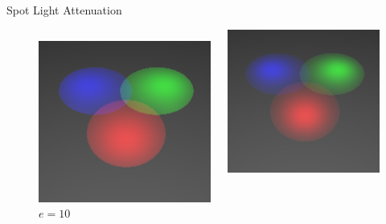 \begin{frame}{Spot Light Attenuation}
{\begin{figure}
\begin{columns}
\begin{column}{0.25\textwidth}
          \includegraphics[width=\linewidth]{images/spot_e_10.png}
          \centering
          {\footnotesize $e=10$}
        \end{column}
        \begin{column}{0.25\textwidth}
          \includegraphics[width=\linewidth]{images/spot_e_20.png}

\end{column}
\end{columns}
\end{figure}}
\end{frame}
